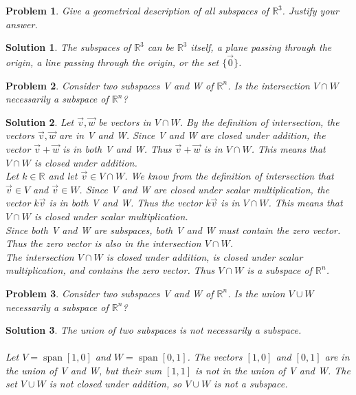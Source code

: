 \documentclass{article}
\newtheorem{problem}{Problem}
\newtheorem*{solution}{Solution}
\DeclareMathOperator{\Span}{span}
\begin{document}
\begin{problem}
Give a geometrical description of all subspaces of $\mathbb{R}^3$. Justify your answer.
\end{problem}

\begin{solution}
The subspaces of $\mathbb{R}^3$ can be $\mathbb{R}^3$ itself, a plane passing through the origin, a line passing through the origin, or the set $\{ \vec{0} \}$.
\end{solution}

\begin{problem}
Consider two subspaces V and W of $\mathbb{R}^n$. Is the intersection $V \cap W$ necessarily a subspace of $\mathbb{R}^n$?
\end{problem}

\begin{solution}
Let $\vec{v}, \vec{w}$ be vectors in $V \cap W$. By the definition of intersection, the vectors $\vec{v}, \vec{w}$ are in V and W. Since V and W are closed under addition, the vector $\vec{v} + \vec{w}$ is in both V and W. Thus $\vec{v} + \vec{w}$ is in $V \cap W$. This means that $V \cap W$ is closed under addition. \\

Let $k \in \mathbb{R}$ and let $\vec{v} \in V \cap W$. We know from the definition of intersection that $\vec{v} \in V$ and $\vec{v} \in W$. Since V and W are closed under scalar multiplication, the vector $k \vec{v}$ is in both V and W. Thus the vector $k \vec{v}$ is in $V \cap W$. This means that $V \cap W$ is closed under scalar multiplication. \\

Since both V and W are subspaces, both V and W must contain the zero vector. Thus the zero vector is also in the intersection $V \cap W$. \\ 

The intersection $V \cap W$ is closed under addition, is closed under scalar multiplication, and contains the zero vector. Thus $V \cap W$ is a subspace of $\mathbb{R}^n$. 
\end{solution}

\begin{problem}
Consider two subspaces V and W of $\mathbb{R}^n$. Is the union $V \cup W$ necessarily a subspace of $\mathbb{R}^n$?
\end{problem}

\begin{solution}
The union of two subspaces is not necessarily a subspace. \\
\\
Let $V = \Span \left[1, 0 \right]$ and $W = \Span \left[0, 1 \right]$. The vectors $\left[1, 0 \right]$ and $\left[0, 1 \right]$ are in the union of V and W, but their sum $\left[1, 1 \right]$ is not in the union of V and W. The set $V \cup W$ is not closed under addition, so $V \cup W$ is not a subspace.
\end{solution}
\end{document}
